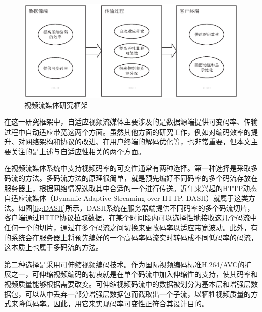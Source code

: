 \begin{figure}[t]
	\centering
	\includegraphics[width = 1.0\linewidth]{eps/research-framework}
	\caption{视频流媒体研究框架 \label{fig:research-framework}}
\end{figure}

在这一研究框架中，自适应视频流媒体主要涉及的是数据源端提供可变码率、传输过程中自动适应带宽这两个方面。虽然其他方面的研究工作，例如对编码效率的提升、对网络架构和协议的改进、在用户终端的解码优化等，也非常重要，但本文主要关注的是上述与自适应性相关的两个方面。

在视频流媒体系统中支持视频码率的可变性通常有两种选择。第一种选择是采取多码流的方法。多码流方法的原理很简单，就是预先编好不同码率的多个码流存放在服务器上，根据网络情况选取其中合适的一个进行传送。近年来兴起的HTTP动态自适应流媒体（Dynamic Adaptive Streaming over HTTP,  DASH）\supercite{Sodagar2011}就属于这类方法。如图\ref{fig:DASH}所示，DASH系统在服务器端提供不同码率的多个码流切片，客户端通过HTTP协议拉取数据，在某个时间段内可以选择性地接收这几个码流中任何一个的切片，通过在多个码流之间切换来更改码率以适应带宽波动。此外，有的系统会在服务器上将预先编好的一个高码率码流实时转码成不同低码率的码流，这本质上也属于多码流的方法。

第二种选择是采用可伸缩视频编码\supercite{SVC-Overview}技术。作为国际视频编码标准H.264/AVC\supercite{H.264}的扩展之一，可伸缩视频编码的初衷就是在单个码流中加入伸缩性的支持，使其码率和视频质量能够根据需要改变。可伸缩视频码流中的数据被划分为基本层和增强层数据包，可以从中丢弃一部分增强层数据包而截取出一个子流，以牺牲视频质量的方式来降低码率。因此，用它来实现码率可变性正符合其设计目的。

